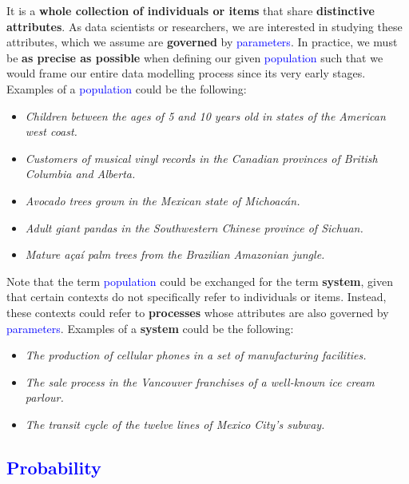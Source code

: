 \documentclass[
  letterpaper,
  DIV=11,
  numbers=noendperiod]{scrreprt}
\providecommand{\tightlist}{%
  \setlength{\itemsep}{0pt}\setlength{\parskip}{0pt}}\usepackage{longtable,booktabs,array}
\begin{document}
It is a \textbf{whole collection of individuals or items} that share
\textbf{distinctive attributes}. As data scientists or researchers, we
are interested in studying these attributes, which we assume are
\textbf{governed} by \textcolor{blue}{parameters}. In practice, we must
be \textbf{as precise as possible} when defining our given
\textcolor{blue}{population} such that we would frame our entire data
modelling process since its very early stages. Examples of a
\textcolor{blue}{population} could be the following:

\begin{itemize}
\tightlist
\item
  \emph{Children between the ages of 5 and 10 years old in states of the
  American west coast.}
\item
  \emph{Customers of musical vinyl records in the Canadian provinces of
  British Columbia and Alberta.}
\item
  \emph{Avocado trees grown in the Mexican state of Michoacán.}
\item
  \emph{Adult giant pandas in the Southwestern Chinese province of
  Sichuan.}
\item
  \emph{Mature açaí palm trees from the Brazilian Amazonian jungle.}
\end{itemize}

Note that the term \textcolor{blue}{population} could be exchanged for
the term \textbf{system}, given that certain contexts do not
specifically refer to individuals or items. Instead, these contexts
could refer to \textbf{processes} whose attributes are also governed by
\textcolor{blue}{parameters}. Examples of a \textbf{system} could be the
following:

\begin{itemize}
\tightlist
\item
  \emph{The production of cellular phones in a set of manufacturing
  facilities.}
\item
  \emph{The sale process in the Vancouver franchises of a well-known ice
  cream parlour.}
\item
  \emph{The transit cycle of the twelve lines of Mexico City's subway.}
\end{itemize}

\subsection*{\texorpdfstring{\textcolor{blue}{Probability}}{}}\label{section-7}
\end{document}
